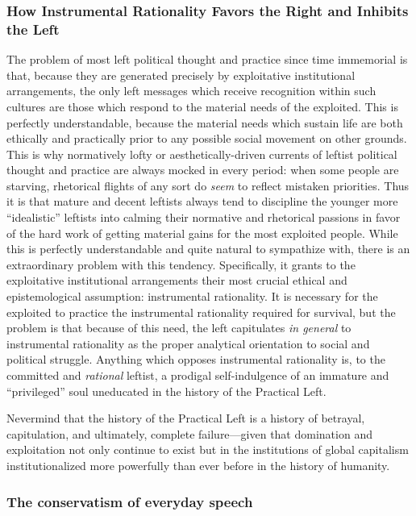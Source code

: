 \documentclass[12pt,book]{article}
\begin{document}
\subsubsection{How Instrumental Rationality Favors the Right and
Inhibits the
Left}\label{how-instrumental-rationality-favors-the-right-and-inhibits-the-left}

The problem of most left political thought and practice since time
immemorial is that, because they are generated precisely by exploitative
institutional arrangements, the only left messages which receive
recognition within such cultures are those which respond to the material
needs of the exploited. This is perfectly understandable, because the
material needs which sustain life are both ethically and practically
prior to any possible social movement on other grounds. This is why
normatively lofty or aesthetically-driven currents of leftist political
thought and practice are always mocked in every period: when some people
are starving, rhetorical flights of any sort do \emph{seem} to reflect
mistaken priorities. Thus it is that mature and decent leftists always
tend to discipline the younger more ``idealistic'' leftists into calming
their normative and rhetorical passions in favor of the hard work of
getting material gains for the most exploited people. While this is
perfectly understandable and quite natural to sympathize with, there is
an extraordinary problem with this tendency. Specifically, it grants to
the exploitative institutional arrangements their most crucial ethical
and epistemological assumption: instrumental rationality. It is
necessary for the exploited to practice the instrumental rationality
required for survival, but the problem is that because of this need, the
left capitulates \emph{in general} to instrumental rationality as the
proper analytical orientation to social and political struggle. Anything
which opposes instrumental rationality is, to the committed and
\emph{rational} leftist, a prodigal self-indulgence of an immature and
``privileged'' soul uneducated in the history of the Practical Left.

Nevermind that the history of the Practical Left is a history of
betrayal, capitulation, and ultimately, complete failure---given that
domination and exploitation not only continue to exist but in the
institutions of global capitalism institutionalized more powerfully than
ever before in the history of humanity.

\subsubsection{The conservatism of everyday
speech}\label{the-conservatism-of-everyday-speech}
\end{document}
